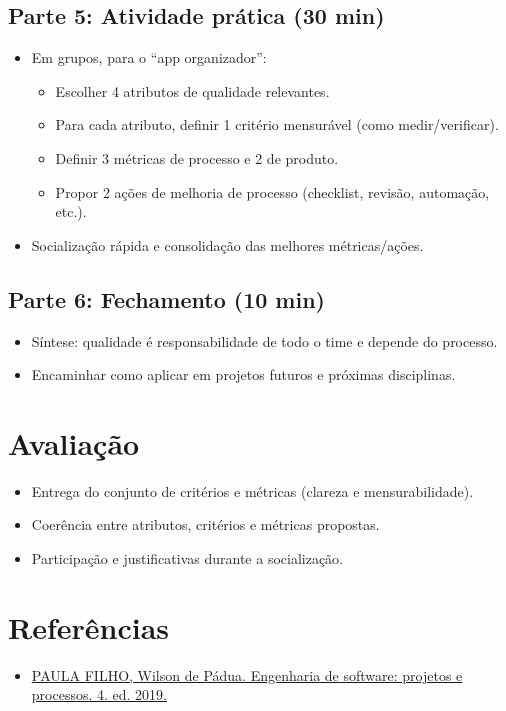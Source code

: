 \documentclass[12pt,a4paper]{article}
\begin{document}
\subsection*{Parte 5: Atividade prática (30 min)}
\begin{itemize}[leftmargin=*,itemsep=0.35em]
  \item Em grupos, para o ``app organizador'':
  \begin{itemize}[leftmargin=*,itemsep=0.25em]
    \item Escolher 4 atributos de qualidade relevantes.
    \item Para cada atributo, definir 1 critério mensurável (como medir/verificar).
    \item Definir 3 métricas de processo e 2 de produto.
    \item Propor 2 ações de melhoria de processo (checklist, revisão, automação, etc.).
  \end{itemize}
  \item Socialização rápida e consolidação das melhores métricas/ações.
\end{itemize}

\subsection*{Parte 6: Fechamento (10 min)}
\begin{itemize}[leftmargin=*,itemsep=0.35em]
  \item Síntese: qualidade é responsabilidade de todo o time e depende do processo.
  \item Encaminhar como aplicar em projetos futuros e próximas disciplinas.
\end{itemize}

\section{Avaliação}
\begin{itemize}[leftmargin=*,itemsep=0.25em]
  \item Entrega do conjunto de critérios e métricas (clareza e mensurabilidade).
  \item Coerência entre atributos, critérios e métricas propostas.
  \item Participação e justificativas durante a socialização.
\end{itemize}

\section{Referências}
\begin{itemize}[leftmargin=*,itemsep=0.25em]
  \item \href{../99-Materiais/Engenharia%20de%20software%20projetos%20e%20processos%20by%20Wilson%20de%20P%C3%A1dua%20Paula%20Filho%20.epub.pdf}{PAULA FILHO, Wilson de Pádua. Engenharia de software: projetos e processos. 4. ed. 2019.}
\end{itemize}
\end{document}
